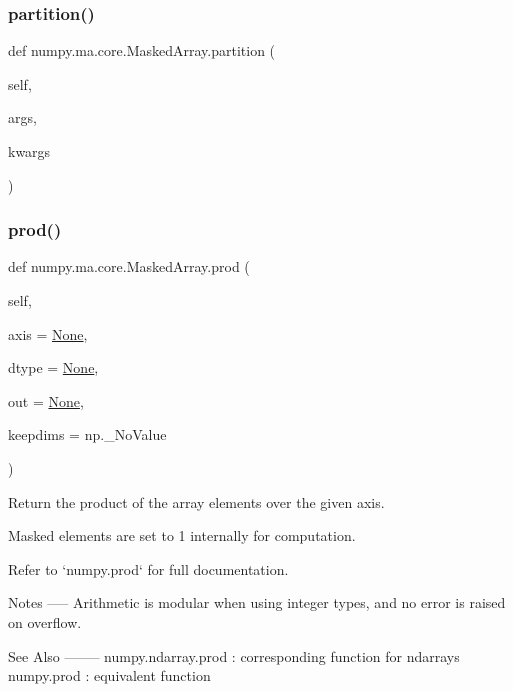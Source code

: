 \subsubsection{\texorpdfstring{partition()}{partition()}}
{\footnotesize\ttfamily def numpy.\+ma.\+core.\+Masked\+Array.\+partition (\begin{DoxyParamCaption}\item[{}]{self,  }\item[{}]{args,  }\item[{}]{kwargs }\end{DoxyParamCaption})}

\mbox{\label{classnumpy_1_1ma_1_1core_1_1MaskedArray_a1d4dab896886f7e5e427fd78d62defa5}} 
\subsubsection{\texorpdfstring{prod()}{prod()}}
{\footnotesize\ttfamily def numpy.\+ma.\+core.\+Masked\+Array.\+prod (\begin{DoxyParamCaption}\item[{}]{self,  }\item[{}]{axis = {\ttfamily \hyperlink{namespacenumpy_1_1ma_1_1core_a647ee1848dfa3692fe35a663a2aa40b3}{None}},  }\item[{}]{dtype = {\ttfamily \hyperlink{namespacenumpy_1_1ma_1_1core_a647ee1848dfa3692fe35a663a2aa40b3}{None}},  }\item[{}]{out = {\ttfamily \hyperlink{namespacenumpy_1_1ma_1_1core_a647ee1848dfa3692fe35a663a2aa40b3}{None}},  }\item[{}]{keepdims = {\ttfamily np.\+\_\+NoValue} }\end{DoxyParamCaption})}

\begin{DoxyVerb}Return the product of the array elements over the given axis.

Masked elements are set to 1 internally for computation.

Refer to `numpy.prod` for full documentation.

Notes
-----
Arithmetic is modular when using integer types, and no error is raised
on overflow.

See Also
--------
numpy.ndarray.prod : corresponding function for ndarrays
numpy.prod : equivalent function
\end{DoxyVerb}
 \mbox{\label{classnumpy_1_1ma_1_1core_1_1MaskedArray_a684493e00d0ddc6433b4d1f4368c151d}} 
